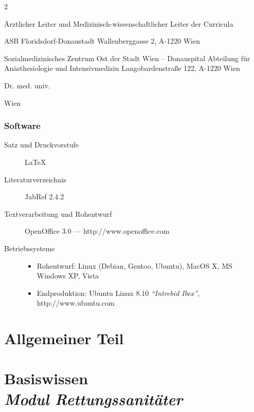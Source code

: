\documentclass[ngerman,a4paper,fontsize=9pt,BCOR=1.5cm,headings=big,draft=no]{scrbook}
\begin{document}
\begin{multicols}{2}
\begin{description}
    \"Arztlicher Leiter und Medizinisch-wissenschaftlicher Leiter der
    Curricula
    
    ASB Floridsdorf-Donaustadt
    Wallenberggasse 2, A-1220 Wien
    
    Sozialmedizinisches Zentrum Ost der Stadt Wien -- Donauspital
    Abteilung f\"ur Anästhesiologie und Intensivmedizin
    Langobardenstra{\ss}e 122, A-1220 Wien
    
    \item[Michael Witthofner]
    Dr. med. univ.
    
    Wien
    
\end{description}
\end{multicols}

\section*{Software}

\begin{description}
\item[Satz und Druckvorstufe] \LaTeX 
\item[Literaturverzeichnis] JabRef 2.4.2  
\item[Textverarbeitung und Rohentwurf] OpenOffice 3.0 --- http://www.openoffice.com
\item[Betriebssysteme] \par

 \begin{itemize}
  \item Rohentwurf: Linux (Debian, Gentoo, Ubuntu), MacOS X, MS Windows XP, Vista
  \item Endproduktion: Ubuntu Linux 8.10 \textit{"`Intrebid
  Ibex"'}, http://www.ubuntu.com
 \end{itemize}
\end{description}




\part{Allgemeiner Teil}







\addtocounter{chapter}{2}

\part{Basiswissen \\ \emph{Modul Rettungssanitäter}}
\end{document}
